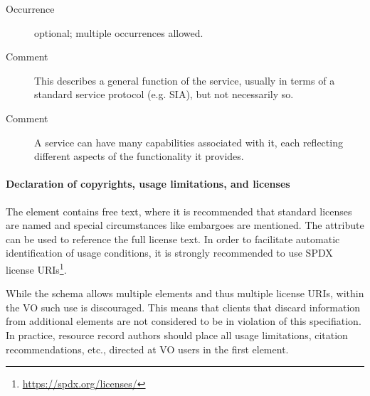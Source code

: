 \documentclass[11pt,a4paper]{ivoa}
\begin{document}
\begin{generated}
\begin{bigdescription}
\begin{description}
\item[Occurrence] optional; multiple occurrences allowed.
\item[Comment]
                        This describes a general function of the
                        service, usually in terms of a standard
                        service protocol (e.g. SIA), but not
                        necessarily so.

\item[Comment]
                        A service can have many capabilities
                        associated with it, each reflecting different
                        aspects of the functionality it provides.


\end{description}


\end{bigdescription}\endgroup

\endgroup
\end{generated}


\paragraph{Declaration of copyrights, usage limitations, and licenses}

The  element contains free text, where it is recommended
that standard licenses are named and special circumstances like embargoes
are mentioned.  The  attribute can be used to
reference the
full license text.  In order to facilitate automatic identification
of usage conditions, it is strongly recommended to use SPDX license
URIs\footnote{\url{https://spdx.org/licenses/}}.

While the schema allows multiple  elements and thus
multiple license URIs, within the VO such use is discouraged.  This
means that clients that discard information from additional
 elements are not considered to be in violation of this
specifiation.  In practice, resource record authors should place all
usage limitations, citation recommendations, etc., directed at VO users
in the first  element.
\end{document}
